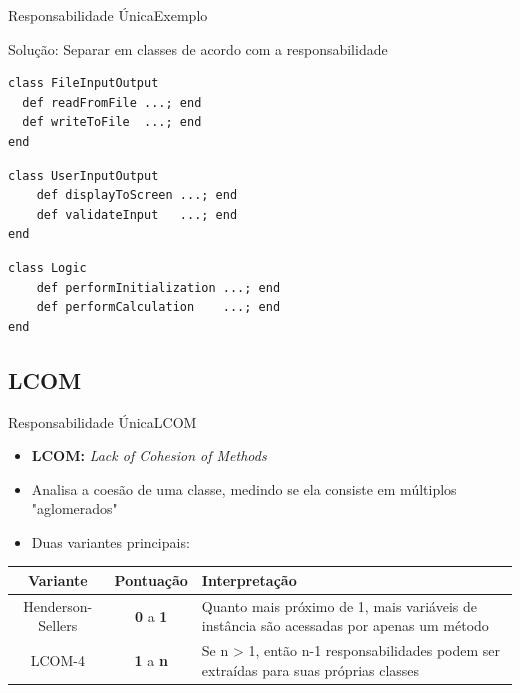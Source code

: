\documentclass[10pt]{beamer}
\begin{document}

\begin{frame}[fragile]{Responsabilidade Única}{Exemplo}

\lstset {
  basicstyle=\footnotesize
}

Solução: Separar em classes de acordo com a responsabilidade

\begin{lstlisting}
class FileInputOutput
  def readFromFile ...; end
  def writeToFile  ...; end
end
\end{lstlisting}

\begin{lstlisting}
class UserInputOutput
    def displayToScreen ...; end
    def validateInput   ...; end
end
\end{lstlisting}

\begin{lstlisting}
class Logic
    def performInitialization ...; end
    def performCalculation    ...; end
end
\end{lstlisting}

\end{frame}


\subsection{LCOM}
\begin{frame}{Responsabilidade Única}{LCOM}

\begin{itemize}
  \item \textbf{LCOM:} \textit{Lack of Cohesion of Methods}
  \item Analisa a coesão de uma classe, medindo se ela consiste em múltiplos "aglomerados"
  \item Duas variantes principais:
\end{itemize}

\begin{table}[H]
  \centering
  \begin{tabular}{|c|c| m{5cm} |} \hline
    \textbf{Variante} & \textbf{Pontuação} & \textbf{Interpretação} \\\hline
    Henderson-Sellers & \textbf{0} a \textbf{1} & Quanto mais próximo de 1, mais variáveis de instância são acessadas por apenas um método \\\hline
    LCOM-4 & \textbf{1} a \textbf{n} & Se n > 1, então n-1 responsabilidades podem ser extraídas para suas próprias classes \\\hline
  \end{tabular}
\end{table}

\end{frame}
\end{document}
